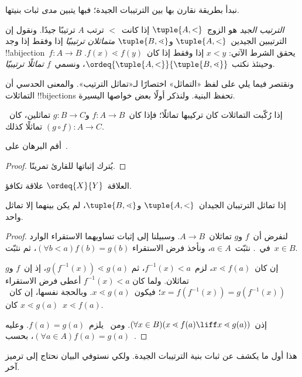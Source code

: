 \documentclass[../../../include/open-logic-section]{subfiles}
\begin{document}

نبدأ بطريقة نقارن بها بين الترتيبات الجيدة؛ فبها يتبين \emph{مدى}
ثبات بنيتها.

\begin{defn}
\emph{الترتيب الجيد} هو الزوج~$\tuple{A, <}$ إذا كانت~$<$ ترتب
$A$ ترتيبًا جيدًا. ونقول إن الترتيبين الجيدين~$\tuple{A, <}$
و$\tuple{B, \lessdot}$ \emph{متماثلان ترتيبيًا} إذا وفقط إذا وجد
!!a{bijection}~$f \colon A \to B$ يحقق الشرط الآتي: $x < y$ إذا
وفقط إذا كان~$f(x) \lessdot f(y)$. وحينئذ نكتب
$\ordeq{\tuple{A, <}}{\tuple{B, \lessdot}}$، ونسمي~$f$
\emph{تماثلًا ترتيبيًا}.
\end{defn}
\noindent
ونقتصر فيما يلي على لفظ «التماثل» اختصارًا لـ«تماثل الترتيب». والمعنى
الحدسي أن التماثلات !!{bijection}s تحفظ البنية. ولنذكر أولًا بعض
خواصها اليسيرة.

\begin{lem}
إذا رُكّبت التماثلات كان تركيبها تماثلًا؛ فإذا كان~$f \colon A \to B$
و$g \colon B \to C$ تماثلين، كان~$(g \circ f) \colon A \to C$
تماثلًا كذلك.
\end{lem}
\begin{prob}
أقم البرهان على~.
\end{prob}
\begin{proof}
يُترك إثباتها للقارئ تمرينًا.
\end{proof}
\begin{cor}
العلاقة~$\ordeq{X}{Y}$ علاقة تكافؤ.
\end{cor}
\begin{prop}
إذا تماثل الترتيبان الجيدان~$\tuple{A, <}$ و$\tuple{B, \lessdot}$،
لم يكن بينهما إلا تماثل واحد.
\end{prop}

\begin{proof}
لنفرض أن~$f$ و$g$ تماثلان~$A \to B$. وسبيلنا إلى إثبات تساويهما
الاستقراء الوارد في~.
  نثبّت~$a\in A$، ونأخذ فرض الاستقراء
  $(\forall b < a)f(b) = g(b)$، ثم نثبّت~$x \in B$.

إن كان~$x \lessdot f(a)$، لزم~$f^{-1}(x) < a$، ثم
$g(f^{-1}(x)) \lessdot g(a)$، إذ إن~$f$ و$g$ تماثلان. ولما كان
$f^{-1}(x) < a$ أعطى فرض الاستقراء
$x =f(f^{-1}(x)) = g(f^{-1}(x))$؛ فيكون~$x \lessdot g(a)$.
وبالحجة نفسها، إن كان~$x \lessdot g(a)$ كان~$x \lessdot f(a)$.

إذن~$(\forall x \in B)(x \lessdot f(a) \liff x \lessdot g(a))$.
ومن~
يلزم~$f(a) = g(a)$. وعليه
$(\forall a \in A)f(a) = g(a)$، بحسب~.
\end{proof}\noindent
هذا أول ما يكشف عن ثبات بنية الترتيبات الجيدة. ولكي نستوفي البيان
نحتاج إلى ترميز آخر.
\end{document}
